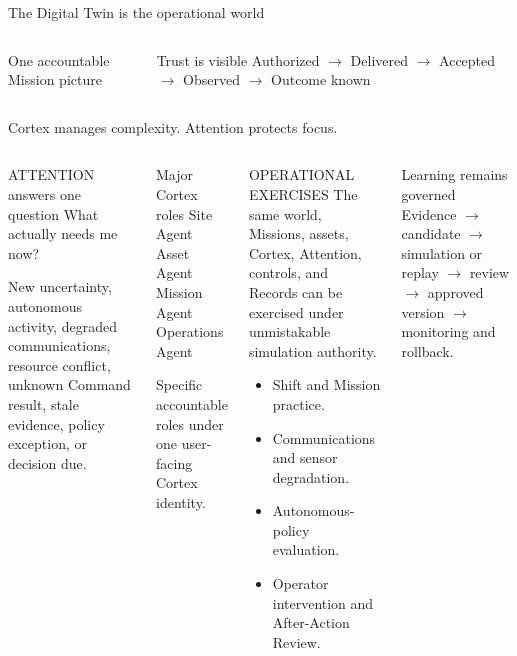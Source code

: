 \documentclass[aspectratio=169,10pt]{beamer}
\begin{document}
\begin{frame}{The Digital Twin is the operational world}
\begin{columns}[T]
\begin{block}{One accountable Mission picture}
\end{block}
\begin{block}{Trust is visible}
\centering\scriptsize Authorized $\rightarrow$ Delivered $\rightarrow$ Accepted $\rightarrow$ Observed $\rightarrow$ Outcome known
\end{block}
\end{columns}
\end{frame}

\begin{frame}{Cortex manages complexity. Attention protects focus.}
\begin{columns}[T]
\begin{block}{ATTENTION answers one question}
\Large What actually needs me now?\vspace{3mm}\par
\small New uncertainty, autonomous activity, degraded communications, resource conflict, unknown Command result, stale evidence, policy exception, or decision due.
\end{block}
\begin{block}{Major Cortex roles}
\small Site Agent \quad Asset Agent \quad Mission Agent \quad Operations Agent\par\vspace{2mm}
{\color{muted}Specific accountable roles under one user-facing Cortex identity.}
\end{block}
\begin{block}{OPERATIONAL EXERCISES}
\small The same world, Missions, assets, Cortex, Attention, controls, and Records can be exercised under unmistakable simulation authority.\vspace{2mm}
\begin{itemize}
  \item Shift and Mission practice.
  \item Communications and sensor degradation.
  \item Autonomous-policy evaluation.
  \item Operator intervention and After-Action Review.
\end{itemize}
\end{block}
\begin{block}{Learning remains governed}
\small Evidence $\rightarrow$ candidate $\rightarrow$ simulation or replay $\rightarrow$ review $\rightarrow$ approved version $\rightarrow$ monitoring and rollback.
\end{block}
\end{columns}
\end{frame}
\end{document}
